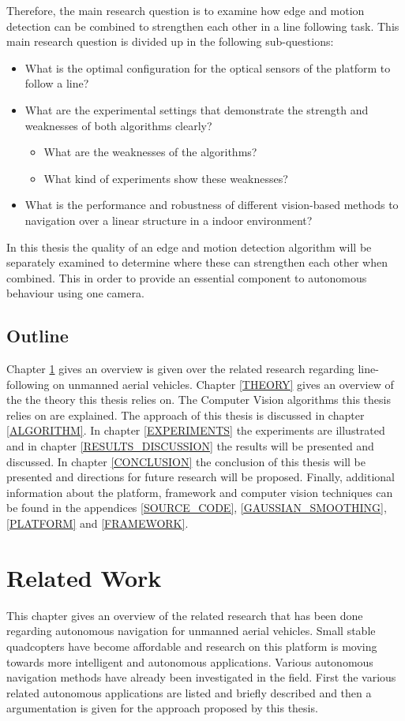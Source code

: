 \documentclass[a4paper]{article}
\begin{document}
Therefore, the main research question is to examine how edge and motion detection can be combined to strengthen each other in a line following task. This main research question is divided up in the following sub-questions:
\begin{itemize}
\item What is the optimal configuration for the optical sensors of the platform to follow a line?
\item What are the experimental settings that demonstrate the strength and weaknesses of both algorithms clearly?
	\begin{itemize}
	\item What are the weaknesses of the algorithms?
	\item What kind of experiments show these weaknesses?
	\end{itemize}
\item What is the performance and robustness of different vision-based methods to navigation over a linear structure in a indoor environment?
\end{itemize}
In this thesis the quality of an edge and motion detection algorithm will be separately examined to determine where these can strengthen each other when combined. This in order to provide an essential component to autonomous behaviour using one camera.
\newpage
\subsection{Outline}
Chapter \ref{RELATED_WORK} gives an overview is given over the related research regarding line-following on unmanned aerial vehicles. Chapter \ref{THEORY} gives an overview of the the theory this thesis relies on. The Computer Vision algorithms this thesis relies on are explained. The approach of this thesis is discussed in chapter \ref{ALGORITHM}. In chapter \ref{EXPERIMENTS} the experiments are illustrated and in chapter \ref{RESULTS_DISCUSSION} the results will be presented and discussed. In chapter \ref{CONCLUSION} the conclusion of this thesis will be presented and directions for future research will be proposed. Finally, additional information about the platform, framework and computer vision techniques can be found in the appendices \ref{SOURCE_CODE}, \ref{GAUSSIAN_SMOOTHING}, \ref{PLATFORM} and \ref{FRAMEWORK}.

\newpage
\section{Related Work}
\label{RELATED_WORK}
This chapter gives an overview of the related research that has been done regarding autonomous navigation for unmanned aerial vehicles. Small stable quadcopters have become affordable and research on this platform is moving towards more intelligent and autonomous applications. Various autonomous navigation methods have already been investigated in the field. First the various related autonomous applications are listed and briefly described and then a argumentation is given for the approach proposed by this thesis.
\end{document}
